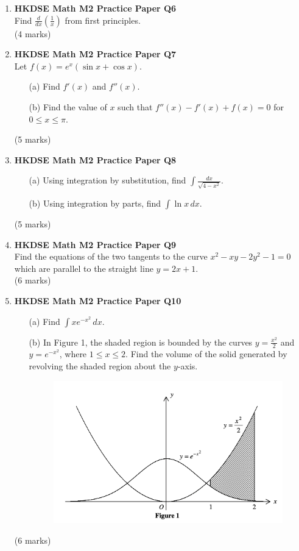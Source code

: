 \documentclass[12pt]{article}
\begin{document}
\begin{enumerate}
	\item \textbf{HKDSE Math M2 Practice Paper Q6}\\
	Find $\displaystyle\frac{d}{dx}\left(\frac{1}{x}\right)$ from first principles. \\(4 marks)

	\item \textbf{HKDSE Math M2 Practice Paper Q7}\\
	Let $f(x) = e^x(\sin{x} + \cos{x})$. 
	\begin{enumerate}
		\item[(a)]Find $f'(x)$ and $f''(x)$. 
		\item[(b)]Find the value of $x$ such that $f''(x) - f'(x) + f(x) = 0$ for $0 \leq x \leq \pi$.
	\end{enumerate}
	(5 marks)

	\item \textbf{HKDSE Math M2 Practice Paper Q8}
	\begin{enumerate}
		\item [(a)]Using integration by substitution, find $\displaystyle\int\frac{dx}{\sqrt{4-x^2}}$. 
		\item [(b)]Using integration by parts, find $\displaystyle\int\ln{x}\,dx$.
	\end{enumerate}
	(5 marks)

	\item \textbf{HKDSE Math M2 Practice Paper Q9}\\
	Find the equations of the two tangents to the curve $x^2 - xy -2y^2 -1 =0$ which are parallel to the straight line $y = 2x+1$. \\(6 marks)

	\item \textbf{HKDSE Math M2 Practice Paper Q10}
	\begin{enumerate}
		\item [(a)]Find $\displaystyle\int xe^{-x^2} \,dx$. 
		\item [(b)]In Figure 1, the shaded region is bounded by the curves $y = \displaystyle\frac{x^2}{2}$ and $y = e^{-x^2}$, where $1 \leq x \leq 2$. Find the volume of the solid generated by revolving the shaded region about the $y$-axis.
		\begin{figure}[H]
			\centering
			\includegraphics[width = .5\linewidth]{PPFigure1}
		\end{figure}
	\end{enumerate}
	(6 marks)


\end{enumerate}
\end{document}
